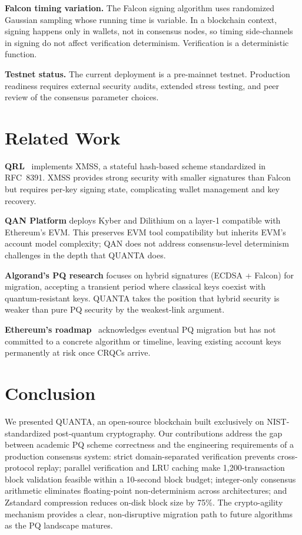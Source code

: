 \documentclass[11pt,a4paper]{article}
\begin{document}
\textbf{Falcon timing variation.} The Falcon signing algorithm uses randomized
Gaussian sampling whose running time is variable. In a blockchain context,
signing happens only in wallets, not in consensus nodes, so timing
side-channels in signing do not affect verification determinism. Verification
is a deterministic function.

\textbf{Testnet status.} The current deployment is a pre-mainnet testnet.
Production readiness requires external security audits, extended stress
testing, and peer review of the consensus parameter choices.

\section{Related Work}

\textbf{QRL}~\cite{hulsing2018} implements XMSS, a stateful hash-based scheme
standardized in RFC~8391. XMSS provides strong security with smaller signatures
than Falcon but requires per-key signing state, complicating wallet management
and key recovery.

\textbf{QAN Platform} deploys Kyber and Dilithium on a layer-1 compatible with
Ethereum's EVM. This preserves EVM tool compatibility but inherits EVM's
account model complexity; QAN does not address consensus-level determinism
challenges in the depth that QUANTA does.

\textbf{Algorand's PQ research} focuses on hybrid signatures (ECDSA + Falcon)
for migration, accepting a transient period where classical keys coexist with
quantum-resistant keys. QUANTA takes the position that hybrid security is
weaker than pure PQ security by the weakest-link argument.

\textbf{Ethereum's roadmap}~\cite{buterin2023} acknowledges eventual PQ
migration but has not committed to a concrete algorithm or timeline, leaving
existing account keys permanently at risk once CRQCs arrive.

\section{Conclusion}

We presented QUANTA, an open-source blockchain built exclusively on
NIST-standardized post-quantum cryptography. Our contributions address the gap
between academic PQ scheme correctness and the engineering requirements of a
production consensus system: strict domain-separated verification prevents
cross-protocol replay; parallel verification and LRU caching make 1,200-transaction
block validation feasible within a 10-second block budget; integer-only
consensus arithmetic eliminates floating-point non-determinism across
architectures; and Zstandard compression reduces on-disk block size by 75\%.
The crypto-agility mechanism provides a clear, non-disruptive migration path
to future algorithms as the PQ landscape matures.
\end{document}
